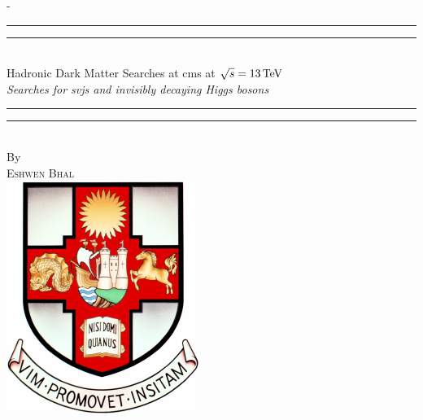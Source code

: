 %
%
% 
%
%
\begin{titlingpage}
\begin{SingleSpace}
\calccentering{\unitlength} 
\begin{adjustwidth*}{\unitlength}{-\unitlength}
\vspace*{13mm}
\begin{center}
\rule[0.5ex]{\linewidth}{2pt}\vspace*{-\baselineskip}\vspace*{3.2pt}
\rule[0.5ex]{\linewidth}{1pt}\\[\baselineskip]
{\HUGE Hadronic Dark Matter Searches at \acrshort{cms} at $\sqrt{s} = \text{13\ensuremath{\,\text{Te\hspace{-.08em}V}}}$}\\[4mm] %
{\Large \textit{Searches for \glspl{svj} and invisibly decaying Higgs bosons}}\\ %
\rule[0.5ex]{\linewidth}{1pt}\vspace*{-\baselineskip}\vspace{3.2pt}
\rule[0.5ex]{\linewidth}{2pt}\\
\vspace{6.5mm}
{\large By}\\
\vspace{6.5mm}
{\large\textsc{Eshwen Bhal}}\\  %
\vspace{11mm}
\includegraphics[scale=0.6]{logos/bristolcrest_colour}\\  %

\end{center}
\end{adjustwidth*}
\end{SingleSpace}
\end{titlingpage}
